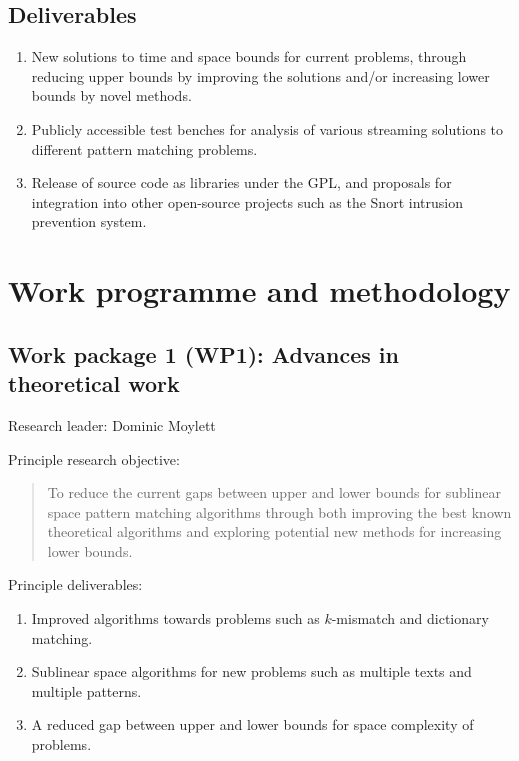 \documentclass[a4paper,11pt]{article}
\begin{document}
    \subsection{Deliverables}

    \begin{enumerate}
        \item New solutions to time and space bounds for current problems, through reducing upper bounds by improving the solutions and/or increasing lower bounds by novel methods.
        \item Publicly accessible test benches for analysis of various streaming solutions to different pattern matching problems.
        \item Release of source code as libraries under the GPL, and proposals for integration into other open-source projects such as the Snort intrusion prevention system.
    \end{enumerate}

    \section{Work programme and methodology}

    \subsection*{Work package 1 (WP1): Advances in theoretical work}

    Research leader: Dominic Moylett

    Principle research objective:
    \begin{quote}
        To reduce the current gaps between upper and lower bounds for sublinear space pattern matching algorithms through both improving the best known theoretical algorithms and exploring potential new methods for increasing lower bounds.
    \end{quote}

    Principle deliverables:
    \begin{enumerate}
        \item Improved algorithms towards problems such as $k$-mismatch and dictionary matching.
        \item Sublinear space algorithms for new problems such as multiple texts and multiple patterns.
        \item A reduced gap between upper and lower bounds for space complexity of problems.
    \end{enumerate}
\end{document}
